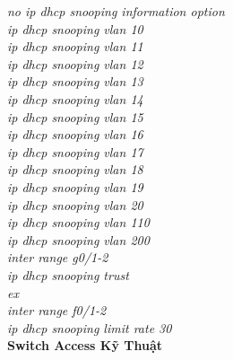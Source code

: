 \documentclass[a4paper, 12pt]{article}
\begin{document}
\hspace*{2cm}\textit{no ip dhcp snooping information option\\
\hspace*{2cm}ip dhcp snooping vlan 10\\
\hspace*{2cm}ip dhcp snooping vlan 11\\
\hspace*{2cm}ip dhcp snooping vlan 12\\
\hspace*{2cm}ip dhcp snooping vlan 13\\
\hspace*{2cm}ip dhcp snooping vlan 14\\
\hspace*{2cm}ip dhcp snooping vlan 15\\
\hspace*{2cm}ip dhcp snooping vlan 16\\
\hspace*{2cm}ip dhcp snooping vlan 17\\
\hspace*{2cm}ip dhcp snooping vlan 18\\
\hspace*{2cm}ip dhcp snooping vlan 19\\
\hspace*{2cm}ip dhcp snooping vlan 20\\
\hspace*{2cm}ip dhcp snooping vlan 110\\
\hspace*{2cm}ip dhcp snooping vlan 200\\
\hspace*{2cm}inter range g0/1-2\\
\hspace*{2cm}ip dhcp snooping trust\\
\hspace*{2cm}ex\\
\hspace*{2cm}inter range f0/1-2\\
\hspace*{2cm}ip dhcp snooping limit rate 30\\}
\hspace*{1cm}\textbf{Switch Access Kỹ Thuật}\\
\end{document}
